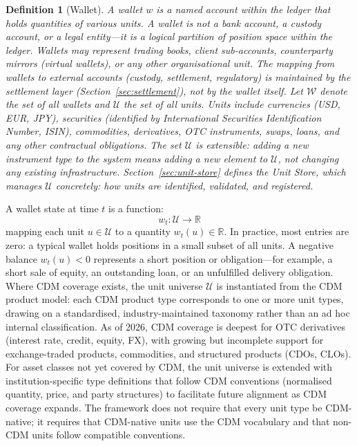 \documentclass[11pt,a4paper]{article}
\newtheorem{definition}{Definition}[section]
\begin{document}
\begin{definition}[Wallet]
A wallet $w$ is a named account within the ledger that holds quantities of various units. A wallet is not a bank account, a custody account, or a legal entity---it is a logical partition of position space within the ledger. Wallets may represent trading books, client sub-accounts, counterparty mirrors (virtual wallets), or any other organisational unit. The mapping from wallets to external accounts (custody, settlement, regulatory) is maintained by the settlement layer (Section~\ref{sec:settlement}), not by the wallet itself. Let $\mathcal{W}$ denote the set of all wallets and $\mathcal{U}$ the set of all units. Units include currencies (USD, EUR, JPY), securities (identified by International Securities Identification Number, ISIN), commodities, derivatives, OTC instruments, swaps, loans, and any other contractual obligations. The set $\mathcal{U}$ is extensible: adding a new instrument type to the system means adding a new element to $\mathcal{U}$, not changing any existing infrastructure. Section~\ref{sec:unit-store} defines the Unit Store, which manages $\mathcal{U}$ concretely: how units are identified, validated, and registered.
\end{definition}

A wallet state at time $t$ is a function:
\[
w_t : \mathcal{U} \to \mathbb{R}
\]
mapping each unit $u \in \mathcal{U}$ to a quantity $w_t(u) \in \mathbb{R}$. In practice, most entries are zero: a typical wallet holds positions in a small subset of all units. A negative balance $w_t(u) < 0$ represents a short position or obligation---for example, a short sale of equity, an outstanding loan, or an unfulfilled delivery obligation. Where CDM coverage exists, the unit universe $\mathcal{U}$ is instantiated from the CDM product model: each CDM product type corresponds to one or more unit types, drawing on a standardised, industry-maintained taxonomy rather than an ad hoc internal classification. As of 2026, CDM coverage is deepest for OTC derivatives (interest rate, credit, equity, FX), with growing but incomplete support for exchange-traded products, commodities, and structured products (CDOs, CLOs). For asset classes not yet covered by CDM, the unit universe is extended with institution-specific type definitions that follow CDM conventions (normalised quantity, price, and party structures) to facilitate future alignment as CDM coverage expands. The framework does not require that every unit type be CDM-native; it requires that CDM-native units use the CDM vocabulary and that non-CDM units follow compatible conventions.
\end{document}
